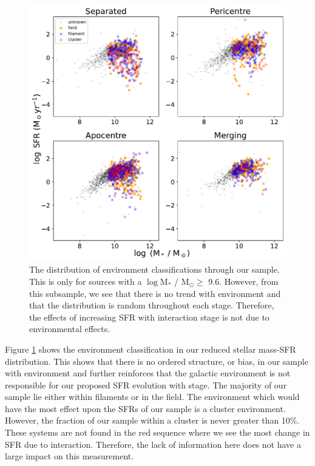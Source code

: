 \begin{figure}
    \centering
    \includegraphics[width=\textwidth]{Chapter3/figures/sfr-mass-density.pdf}
    \caption[The distribution of environment classifications through our sample.]{The distribution of environment classifications through our sample. This is only for sources with a $\log$M$_*$ / M$_\odot \geq$ 9.6. However, from this subsample, we see that there is no trend with environment and that the distribution is random throughout each stage. Therefore, the effects of increasing SFR with interaction stage is not due to environmental effects.}
    \label{fig:dens-sfr-mass}
\end{figure}

Figure \ref{fig:dens-sfr-mass} shows the environment classification in our reduced stellar mass-SFR distribution. This shows that there is no ordered structure, or bias, in our sample with environment and further reinforces that the galactic environment is not responsible for our proposed SFR evolution with stage. The majority of our sample lie either within filaments or in the field. The environment which would have the most effect upon the SFRs of our sample is a cluster environment. However, the fraction of our sample within a cluster is never greater than 10\%. These systems are not found in the red sequence where we see the most change in SFR due to interaction. Therefore, the lack of information here does not have a large impact on this measurement. 

